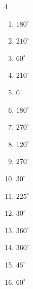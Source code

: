 \begin{multicols}{4}
\begin{enumerate}
  \item $\displaystyle 180^{\circ}$
        \phantom{$\displaystyle =\pi$}

  \item $\displaystyle 210^{\circ}$

  \item $\displaystyle 60^{\circ}$

  \item $\displaystyle 210^{\circ}$

  \item $\displaystyle 0^{\circ}$
        \phantom{$\displaystyle =0$}

  \item $\displaystyle 180^{\circ}$
        \phantom{$\displaystyle =\pi$}

  \item $\displaystyle 270^{\circ}$

  \item $\displaystyle 120^{\circ}$

  \item $\displaystyle 270^{\circ}$

  \item $\displaystyle 30^{\circ}$

  \item $\displaystyle 225^{\circ}$

\columnbreak %

  \item $\displaystyle 30^{\circ}$

  \item $\displaystyle 360^{\circ}$
        \phantom{$\displaystyle =2\pi$}

  \item $\displaystyle 360^{\circ}$
        \phantom{$\displaystyle =2\pi$}

  \item $\displaystyle 45^{\circ}$

  \item $\displaystyle 60^{\circ}$


\end{enumerate}
\end{multicols}

